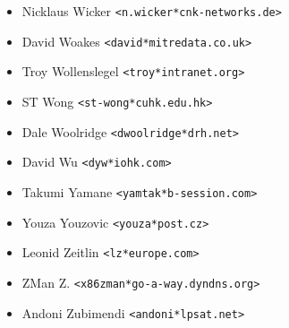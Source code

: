 \documentclass[a4paper,titlepage,12pt]{article}
\newcommand{\email}[1]{\texttt{#1}}
\begin{document}
\begin{itemize}
	\item Nicklaus Wicker \email{<n.wicker*cnk-networks.de>}
	\item David Woakes \email{<david*mitredata.co.uk>}
	\item Troy Wollenslegel \email{<troy*intranet.org>}
	\item ST Wong \email{<st-wong*cuhk.edu.hk>}
	\item Dale Woolridge \email{<dwoolridge*drh.net>}
	\item David Wu \email{<dyw*iohk.com>}
	\item Takumi Yamane \email{<yamtak*b-session.com>}
	\item Youza Youzovic \email{<youza*post.cz>}
	\item Leonid Zeitlin \email{<lz*europe.com>}
	\item ZMan Z. \email{<x86zman*go-a-way.dyndns.org>}
	\item Andoni Zubimendi \email{<andoni*lpsat.net>}
    \end{itemize}
\end{document}
